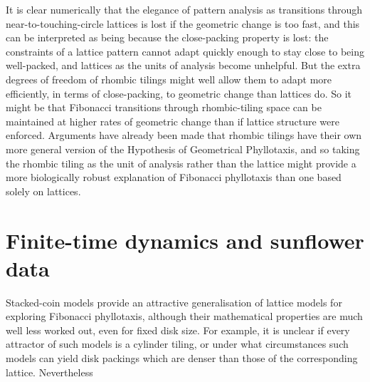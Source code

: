 \clearpage




It is clear numerically that the elegance of pattern analysis as transitions through near-to-touching-circle lattices is lost if the geometric change is too fast, and this can be interpreted as being because the close-packing property is lost: the constraints of a lattice pattern cannot adapt quickly enough to stay close to being well-packed,
and lattices as the units of analysis become unhelpful. 
But the extra degrees of freedom of rhombic tilings might well allow them to adapt more efficiently, in terms of close-packing, to geometric change than lattices do. So it might be that Fibonacci transitions through rhombic-tiling space can be maintained at higher rates of geometric change than if lattice structure were enforced. Arguments have already been made that rhombic tilings have their own more general version of the Hypothesis of Geometrical Phyllotaxis, and so taking the rhombic tiling as the unit of analysis rather than the lattice might provide 
a more biologically robust explanation of Fibonacci phyllotaxis than one based solely on lattices. 
\clearpage
\section{Finite-time dynamics and sunflower data}
Stacked-coin models provide an attractive generalisation of lattice models for exploring Fibonacci phyllotaxis, although their mathematical properties are much well less worked out, even for fixed disk size.  For example,  it is unclear if every attractor of such models is a cylinder tiling, or under what circumstances
such models can yield disk packings which are denser than those of the corresponding lattice. Nevertheless 

